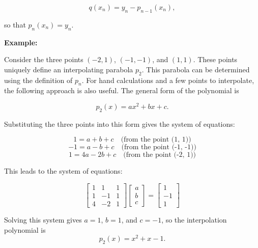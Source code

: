 \[
	q(x_n) = y_n - p_{n-1}(x_n),
\]

so that \(p_n(x_n) = y_n\). 

\QED

\textbf{Example:}

Consider the three points \((-2, 1)\), \((-1, -1)\), and \((1, 1)\). 
These points uniquely define an interpolating parabola \(p_2\). This parabola can be 
determined using the definition of \(p_n\). 
For hand calculations and a few 
points to interpolate, the following approach is also useful. The general form of the polynomial is 

\[
	p_2(x) = ax^2 + bx + c.
\]

Substituting the three points into this form gives the system of equations:

\[
	1 = a + b + c \quad \text{(from the point (1, 1))}
\]
\[
	-1 = a - b + c \quad \text{(from the point (-1, -1))}
\]
\[
	1 = 4a - 2b + c \quad \text{(from the point (-2, 1))}
\]

This leads to the system of equations:

\[
	\begin{bmatrix}
	1 & 1 & 1 \\
	1 & -1 & 1 \\
	4 & -2 & 1
	\end{bmatrix}
	\begin{bmatrix}
	a \\
	b \\
	c
	\end{bmatrix}
	=
	\begin{bmatrix}
	1 \\
	-1 \\
	1
	\end{bmatrix}
\]

Solving this system gives \(a = 1\), \(b = 1\), and \(c = -1\), so the interpolation polynomial is
\[
	p_2(x) = x^2 + x - 1.
\]

